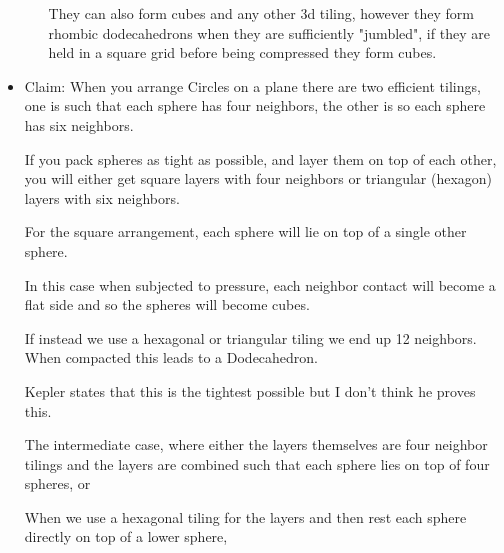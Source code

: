 \documentclass{report}
\begin{document}
\begin{itemize}
\begin{mdframed}
\begin{itemize}
                    \begin{mdframed}
                        They can also form cubes and any
                        other 3d tiling, however they
                        form rhombic dodecahedrons when
                        they are sufficiently "jumbled",
                        if they are held in a square grid
                        before being compressed they form
                        cubes.
                    \end{mdframed}
            \end{itemize}
        \end{mdframed}
    \item Claim: When you arrange Circles on a plane there
        are two efficient tilings, one is such that
        each sphere has four neighbors, the other is
        so each sphere has six neighbors.
        \begin{mdframed}
            If you pack spheres as tight as possible,
            and layer them on top of each other, you will
            either get square layers with four neighbors
            or triangular (hexagon) layers with six
            neighbors.

            For the square arrangement, each sphere will
            lie on top of a single other sphere.

            In this case when subjected to pressure, each neighbor
            contact will become a flat side and so the spheres
            will become cubes.
        \end{mdframed}
        \begin{mdframed}
            If instead we use a hexagonal or triangular
            tiling we end up 12 neighbors. When compacted
            this leads to a Dodecahedron.

            Kepler states that this is the tightest possible
            but I don't think he proves this.
        \end{mdframed}
        \begin{mdframed}
            The intermediate case, where either the
            layers themselves are four neighbor tilings and
            the layers are combined such that each sphere
            lies on top of four spheres, or

            When we use a hexagonal tiling for the layers
            and then rest each sphere directly on top
            of a lower sphere,


\end{mdframed}
\end{itemize}
\end{document}
